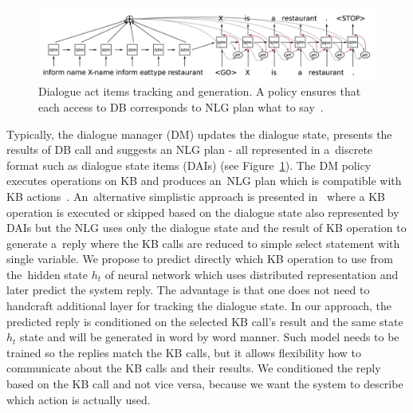 \documentclass[11pt]{article}
\begin{document}
\begin{figure}[htb]
    \centering
    \includegraphics[width=1.0\linewidth]{dusek_seq2seq}
    \caption{Dialogue act items tracking and generation. A policy ensures that each access to DB corresponds to NLG plan what to say~\cite{dusek_sequence2sequence_2016}.}
\label{fig:dai_gen}
\end{figure}

Typically, the dialogue manager (DM) updates the dialogue state, presents the results of DB call and suggests an NLG plan - all represented in a~discrete format such as dialogue state items (DAIs) (see Figure~\ref{fig:dai_gen}).
The DM policy executes operations on KB and produces an~NLG plan  which is compatible with KB actions~\cite{dusek_sequence2sequence_2016,young2010hidden}.
An~alternative simplistic approach is presented in~\cite{wen_networkbased_2016} where a KB operation is executed or skipped based on the dialogue state also represented by DAIs but the NLG uses only the dialogue state and the result of KB operation to generate a~reply where the KB calls are reduced to simple select statement with single variable.
We propose to predict directly which KB operation to use from the~hidden state $h_t$ of neural network which uses distributed representation and later predict the system reply.
The advantage is that one does not need to handcraft additional layer for tracking the dialogue state.
In our approach, the predicted reply is conditioned on the selected KB call's result and the same state $h_t$ state and will be generated in word by word manner.
Such model needs to be trained so the replies match the KB calls, but it allows flexibility how to communicate about the KB calls and their results.
We conditioned the reply based on the KB call and not vice versa, because we want the system to describe which action is actually used. 
\end{document}
